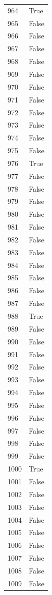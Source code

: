 \documentclass[
  letterpaper,
  DIV=11,
  numbers=noendperiod]{scrreprt}
\begin{document}
\begin{tabular}{ll}
964  &   True \\
965  &  False \\
966  &  False \\
967  &  False \\
968  &  False \\
969  &  False \\
970  &  False \\
971  &  False \\
972  &  False \\
973  &  False \\
974  &  False \\
975  &  False \\
976  &   True \\
977  &  False \\
978  &  False \\
979  &  False \\
980  &  False \\
981  &  False \\
982  &  False \\
983  &  False \\
984  &  False \\
985  &  False \\
986  &  False \\
987  &  False \\
988  &   True \\
989  &  False \\
990  &  False \\
991  &  False \\
992  &  False \\
993  &  False \\
994  &  False \\
995  &  False \\
996  &  False \\
997  &  False \\
998  &  False \\
999  &  False \\
1000 &   True \\
1001 &  False \\
1002 &  False \\
1003 &  False \\
1004 &  False \\
1005 &  False \\
1006 &  False \\
1007 &  False \\
1008 &  False \\
1009 &  False \\

\end{tabular}
\end{document}
